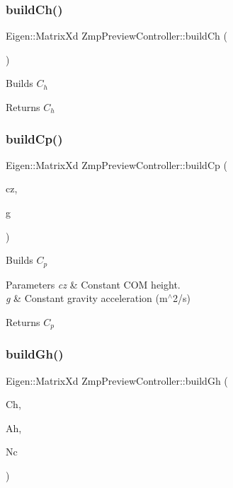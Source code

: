 \subsubsection{\texorpdfstring{build\+Ch()}{buildCh()}}
{\footnotesize\ttfamily Eigen\+::\+Matrix\+Xd Zmp\+Preview\+Controller\+::build\+Ch (\begin{DoxyParamCaption}{ }\end{DoxyParamCaption})}

Builds $C_h$

\begin{DoxyReturn}{Returns}
$C_h$ 
\end{DoxyReturn}
\hypertarget{classZmpPreviewController_a716fdc040e5eaf9f6fe00c652f205d73}{}\label{classZmpPreviewController_a716fdc040e5eaf9f6fe00c652f205d73} 
\subsubsection{\texorpdfstring{build\+Cp()}{buildCp()}}
{\footnotesize\ttfamily Eigen\+::\+Matrix\+Xd Zmp\+Preview\+Controller\+::build\+Cp (\begin{DoxyParamCaption}\item[{const double}]{cz,  }\item[{const double}]{g }\end{DoxyParamCaption})}

Builds $C_p$


\begin{DoxyParams}{Parameters}
{\em cz} & Constant C\+OM height. \\
\hline
{\em g} & Constant gravity acceleration (m$^\wedge$2/s)\\
\hline
\end{DoxyParams}
\begin{DoxyReturn}{Returns}
$C_p$ 
\end{DoxyReturn}
\hypertarget{classZmpPreviewController_ac0e73fabb20f31dbbb85ce61414dbb87}{}\label{classZmpPreviewController_ac0e73fabb20f31dbbb85ce61414dbb87} 
\subsubsection{\texorpdfstring{build\+Gh()}{buildGh()}}
{\footnotesize\ttfamily Eigen\+::\+Matrix\+Xd Zmp\+Preview\+Controller\+::build\+Gh (\begin{DoxyParamCaption}\item[{Eigen\+::\+Matrix\+Xd}]{Ch,  }\item[{Eigen\+::\+Matrix\+Xd}]{Ah,  }\item[{const int}]{Nc }\end{DoxyParamCaption})}

